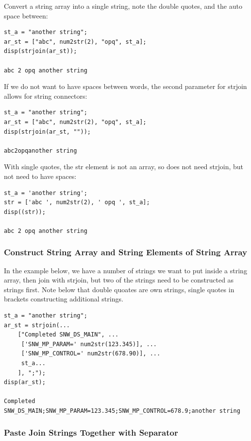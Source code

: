 \documentclass[
]{book}
\begin{document}
Convert a string array into a single string, note the double quotes, and
the auto space between:

\begin{verbatim}
st_a = "another string";
ar_st = ["abc", num2str(2), "opq", st_a];
disp(strjoin(ar_st));

abc 2 opq another string
\end{verbatim}

If we do not want to have spaces between words, the second parameter for
strjoin allows for string connectors:

\begin{verbatim}
st_a = "another string";
ar_st = ["abc", num2str(2), "opq", st_a];
disp(strjoin(ar_st, ""));

abc2opqanother string
\end{verbatim}

With single quotes, the str element is not an array, so does not need
strjoin, but not need to have spaces:

\begin{verbatim}
st_a = 'another string';
str = ['abc ', num2str(2), ' opq ', st_a];
disp((str));

abc 2 opq another string
\end{verbatim}

\hypertarget{construct-string-array-and-string-elements-of-string-array}{%
\subsubsection{Construct String Array and String Elements of String Array}\label{construct-string-array-and-string-elements-of-string-array}}

In the example below, we have a number of strings we want to put inside
a string array, then join with strjoin, but two of the strings need to
be constructed as strings first. Note below that double quoates are own
strings, single quotes in brackets constructing additional strings.

\begin{verbatim}
st_a = "another string";
ar_st = strjoin(...
    ["Completed SNW_DS_MAIN", ...
     ['SNW_MP_PARAM=' num2str(123.345)], ...
     ['SNW_MP_CONTROL=' num2str(678.90)], ...
     st_a...
    ], ";");
disp(ar_st);

Completed SNW_DS_MAIN;SNW_MP_PARAM=123.345;SNW_MP_CONTROL=678.9;another string
\end{verbatim}

\hypertarget{paste-join-strings-together-with-separator}{%
\subsubsection{Paste Join Strings Together with Separator}\label{paste-join-strings-together-with-separator}}
\end{document}
